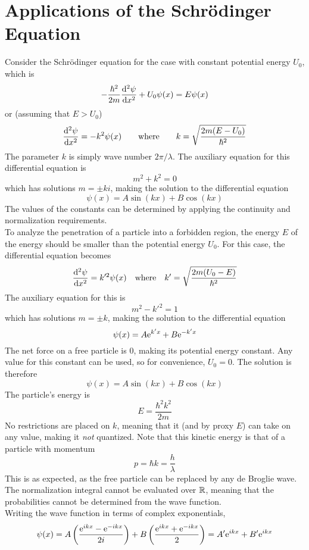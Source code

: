 \documentclass{subfiles}
\begin{document}
	\section{Applications of the Schr\"odinger Equation}
			Consider the Schr\"odinger equation for the case with constant potential energy \(U_0\), which is
				\[-\frac{\hbar^2}{2m}\dv[2]{\psi}{x} + U_0\psi(x) = E\psi(x)\]
				or (assuming that \(E > U_0\))
				\[
					\dv[2]{\psi}{x} = -k^2\psi(x) \qquad \text{where} \qquad
						k = \sqrt{\frac{2m(E - U_0)}{\hbar^2}}
				\]
				The parameter \(k\) is simply wave number \(2\pi/\lambda\). The auxiliary equation for this differential equation is
				\[m^2 + k^2 = 0\]
				which has solutions \(m = \pm ki\), making the solution to the differential equation
				\[\psi(x) = A\sin(kx) + B\cos(kx)\]
				The values of the constants can be determined by applying the continuity and normalization requirements. \\
				To analyze the penetration of a particle into a forbidden region, the energy \(E\) of the energy should be smaller than the potential energy \(U_0\). For this case, the differential equation becomes
				\[
					\dv[2]{\psi}{x} = k'^2\psi(x) \quad \text{where} \quad
						k' = \sqrt{\frac{2m(U_0 - E)}{\hbar^2}}
				\]
				The auxiliary equation for this is
				\[m^2 - k'^2 = 1\]
				which has solutions \(m = \pm k\), making the solution to the differential equation
				\[\psi(x) = A\text{e}^{k'x} + B\text{e}^{-k'x}\]
			The net force on a free particle is 0, making its potential energy constant. Any value for this constant can be used, so for convenience, \(U_0 = 0\). The solution is therefore
				\[\psi(x) = A\sin(kx) + B\cos(kx)\]
				The particle's energy is
				\[E = \frac{\hbar^2k^2}{2m}\]
				No restrictions are placed on \(k\), meaning that it (and by proxy \(E\)) can take on any value, making it \textit{not} quantized. Note that this kinetic energy is that of a particle with momentum
				\[p = \hbar k = \frac{h}{\lambda}\]
				This is as expected, as the free particle can be replaced by any de Broglie wave. \\
				The normalization integral cannot be evaluated over \(\mathbb{R}\), meaning that the probabilities cannot be determined from the wave function. \\
				Writing the wave function in terms of complex exponentials,
				\[
					\psi(x) = A\left(\frac{\text{e}^{ikx} - \text{e}^{-ikx}}{2i}\right) + B\left(\frac{\text{e}^{ikx} + \text{e}^{-ikx}}{2}\right)
						= A'\text{e}^{ikx} + B'\text{e}^{ikx}
				\]
\end{document}
